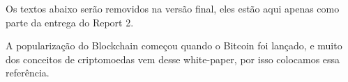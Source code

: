 \documentclass[
	12pt,				 %
	oneside,			 %
	a4paper,			 %
	chapter=TITLE,		 %
	section=TITLE,		 %
	sumario=tradicional, %
	english,			 %
	french,				 %
	spanish,			 %
	brazil				 %
	]{abntex2}
\begin{document}

\frenchspacing 

\imprimircapa
\imprimirfolhaderosto*









Os textos abaixo serão removidos na versão final, eles estão aqui apenas como parte da entrega do Report 2.

\cite{bitcoin} 
A popularização do Blockchain começou quando o Bitcoin foi lançado, e muito dos conceitos de criptomoedas vem desse white-paper, por isso colocamos essa referência.
\end{document}
